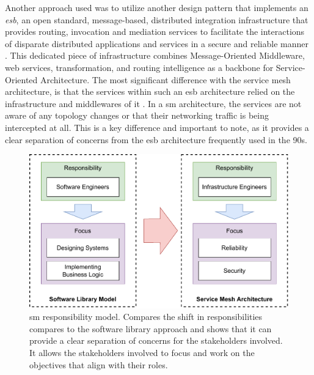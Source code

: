 Another approach used was to utilize another design pattern that implements an \textit{\gls{esb}}, an open standard, message-based, distributed integration infrastructure that provides routing, invocation and mediation services to facilitate the interactions of disparate distributed applications and services in a secure and reliable manner \cite{menge2007enterprise}. This dedicated piece of infrastructure combines  Message-Oriented Middleware, web services, transformation, and routing intelligence as a backbone for Service-Oriented Architecture. The most significant difference with the service mesh architecture, is that the services within such an \gls{esb} architecture relied on the infrastructure and middlewares of it \cite{samnewman2022}. In a \gls{sm} architecture, the services are not aware of any topology changes or that their networking traffic is being intercepted at all. This is a key difference and important to note, as it provides a clear separation of concerns from the \gls{esb} architecture frequently used in the 90s.

\begin{figure}[!t]
    \centering
    
    \includegraphics[width=0.8\linewidth]{2_background/figures/responsibility-model.pdf}

    \caption[Service Mesh Responsibility Model]{\Gls{sm} responsibility model. Compares the shift in responsibilities compares to the software library approach and shows that it can provide a clear separation of concerns for the stakeholders involved. It allows the stakeholders involved to focus and work on the objectives that align with their roles.}
    \label{fig:service-mesh-responsibility-model}
\end{figure}

